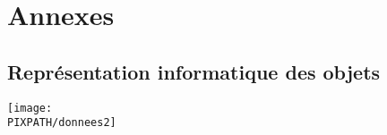 \section{Annexes}
\subsection{Représentation informatique des objets}
    \begin{center}
    \texttt{[image: \\PIXPATH/donnees2]}
    \end{center}
